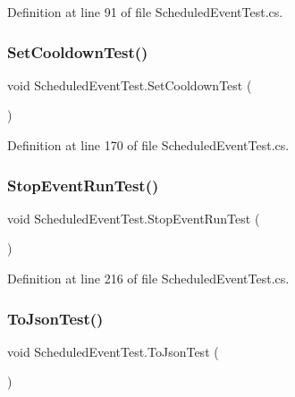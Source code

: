 Definition at line 91 of file Scheduled\+Event\+Test.\+cs.

\mbox{\label{class_scheduled_event_test_a96c7c9cc561375e7f6c971569f84f390}} 
\subsubsection{\texorpdfstring{Set\+Cooldown\+Test()}{SetCooldownTest()}}
{\footnotesize\ttfamily void Scheduled\+Event\+Test.\+Set\+Cooldown\+Test (\begin{DoxyParamCaption}{ }\end{DoxyParamCaption})}



Definition at line 170 of file Scheduled\+Event\+Test.\+cs.

\mbox{\label{class_scheduled_event_test_a5c3cd21fcea5c19dc23b71985850cf64}} 
\subsubsection{\texorpdfstring{Stop\+Event\+Run\+Test()}{StopEventRunTest()}}
{\footnotesize\ttfamily void Scheduled\+Event\+Test.\+Stop\+Event\+Run\+Test (\begin{DoxyParamCaption}{ }\end{DoxyParamCaption})}



Definition at line 216 of file Scheduled\+Event\+Test.\+cs.

\mbox{\label{class_scheduled_event_test_a7320b6385df779ca061f9abf07175a0a}} 
\subsubsection{\texorpdfstring{To\+Json\+Test()}{ToJsonTest()}}
{\footnotesize\ttfamily void Scheduled\+Event\+Test.\+To\+Json\+Test (\begin{DoxyParamCaption}{ }\end{DoxyParamCaption})}




